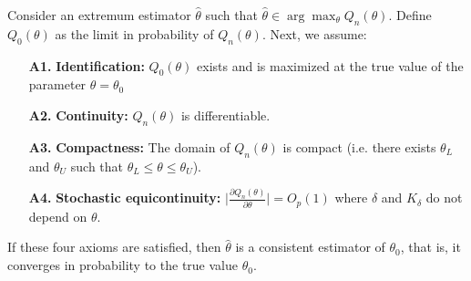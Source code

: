 \begin{theorem}
Consider an extremum estimator $\hat\theta$ such that  $\hat\theta \in \operatorname{arg}\max_{\theta} Q_n(\theta)$. Define $Q_0(\theta)$ as the limit in probability of $Q_n(\theta)$.
Next, we assume:\begin{itemize}
\item[\textbf{A1.}] \textbf{Identification:} $Q_0(\theta)$ exists and is maximized at the true value of the parameter $\theta = \theta_0$
\item[\textbf{A2.}] \textbf{Continuity:} $Q_n(\theta)$ is differentiable.
\item[\textbf{A3.}] \textbf{Compactness:} The domain of $Q_n(\theta)$ is compact (i.e. there exists $\theta_L$ and $\theta_U$ such that $\theta_L\leq \theta\leq\theta_U$).
\item[\textbf{A4.}] \textbf{Stochastic equicontinuity:} $\lvert \frac{\partial Q_n(\theta)}{\partial \theta}\rvert = O_p(1)$ where $\delta$ and $K_{\delta}$ do not depend on $\theta$.
\end{itemize}
If these four axioms are satisfied, then $\hat\theta$ is a consistent estimator of $\theta_0$, that is, it converges in probability to the true value $\theta_0$.
\end{theorem}

